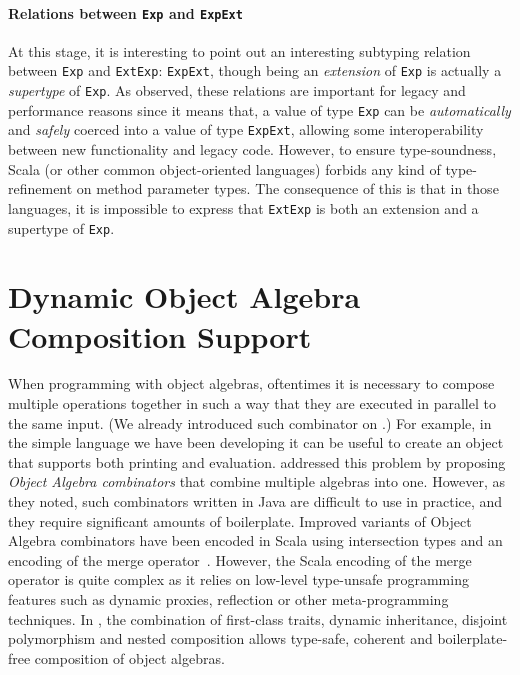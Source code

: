 \paragraph{Relations between \lstinline{Exp} and \lstinline{ExpExt}}

At this stage, it is interesting to point out an interesting subtyping relation
between \lstinline{Exp} and \lstinline{ExtExp}: \lstinline{ExpExt}, though being an
\emph{extension} of \lstinline{Exp} is actually a \emph{supertype} of \lstinline{Exp}.
As \citet{oliveira09modular} observed, these relations are
important for legacy and performance reasons since it means that, a value of
type \lstinline{Exp} can be \emph{automatically} and \emph{safely}
coerced into a value of type \lstinline{ExpExt}, allowing some
interoperability between new functionality and legacy code.
However, to ensure type-soundness, Scala (or other common object-oriented languages) forbids any kind of type-refinement on method
parameter types. The consequence of this is that in those languages, it is
impossible to express that \lstinline{ExtExp} is both an extension and a
supertype of \lstinline{Exp}.




\section{Dynamic Object Algebra Composition Support}
\label{sec:case:combinator}

When programming with object algebras, oftentimes it is necessary to compose
multiple operations together in such a way that they are executed in parallel to
the same input. (We already introduced such combinator on .)
For example, in the simple language we have been developing it
can be useful to create an object that supports both printing and evaluation.
\citet{oliveira2012extensibility} addressed this problem by
proposing \emph{Object Algebra combinators} that combine multiple algebras into
one. However, as they noted, such combinators written in Java are difficult to
use in practice, and they require significant amounts of boilerplate. Improved
variants of Object Algebra combinators have been encoded in Scala using
intersection types and an encoding of the merge
operator~\citep{oliveira2013feature, rendel14attributes}. However, the Scala
encoding of the merge operator is quite complex as it relies on low-level
type-unsafe programming features such as dynamic proxies, reflection or other
meta-programming techniques. In \sedel, the combination of first-class traits,
dynamic inheritance, disjoint polymorphism and nested composition allows type-safe, coherent and
boilerplate-free composition of object algebras.

